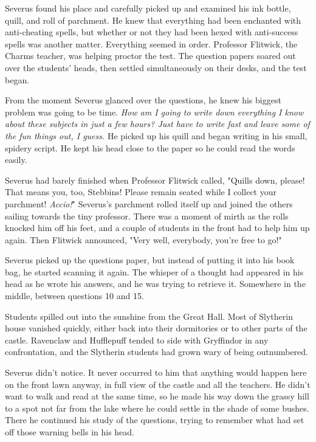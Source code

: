 \documentclass[a4paper,11pt]{article}
\begin{document}
Severus found his place and carefully picked up and examined his ink bottle, quill, and roll of parchment. He knew that everything had been enchanted with anti-cheating spells, but whether or not they had been hexed with anti-success spells was another matter. Everything seemed in order. Professor Flitwick, the Charms teacher, was helping proctor the test. The question papers soared out over the students' heads, then settled simultaneously on their desks, and the test began.

From the moment Severus glanced over the questions, he knew his biggest problem was going to be time. \emph{How am I going to write down everything I know about these subjects in just a few hours? Just have to write fast and leave some of the fun things out, I guess.} He picked up his quill and began writing in his small, spidery script. He kept his head close to the paper so he could read the words easily.

Severus had barely finished when Professor Flitwick called, "Quills down, please! That means you, too, Stebbins! Please remain seated while I collect your parchment! \emph{Accio!}" Severus's parchment rolled itself up and joined the others sailing towards the tiny professor. There was a moment of mirth as the rolls knocked him off his feet, and a couple of students in the front had to help him up again. Then Flitwick announced, "Very well, everybody, you're free to go!"

Severus picked up the questions paper, but instead of putting it into his book bag, he started scanning it again. The whisper of a thought had appeared in his head as he wrote his answers, and he was trying to retrieve it. Somewhere in the middle, between questions 10 and 15.

Students spilled out into the sunshine from the Great Hall. Most of Slytherin house vanished quickly, either back into their dormitories or to other parts of the castle. Ravenclaw and Hufflepuff tended to side with Gryffindor in any confrontation, and the Slytherin students had grown wary of being outnumbered.

Severus didn't notice. It never occurred to him that anything would happen here on the front lawn anyway, in full view of the castle and all the teachers. He didn't want to walk and read at the same time, so he made his way down the grassy hill to a spot not far from the lake where he could settle in the shade of some bushes. There he continued his study of the questions, trying to remember what had set off those warning bells in his head.
\end{document}
